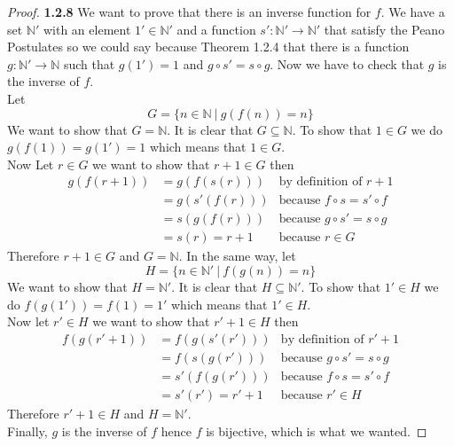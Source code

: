 \documentclass[11pt]{article}
\newcommand{\N}{\mathbb{N}}
\theoremstyle{definition}
\begin{document}
    \begin{proof}{\textbf{1.2.8}}
        We want to prove that there is an inverse function for $f$. We have a
        set $\N'$ with an element $1'\in\N'$ and a function
        $s':\N'\rightarrow \N'$ that satisfy the Peano Postulates so we could
        say because Theorem 1.2.4 that there is a function
        $g:\N' \rightarrow \N$ such that $g(1') = 1$ and $g \circ s' = s \circ g$.
        Now we have to check that $g$ is the inverse of $f$.\\
        Let
        $$G = \{n \in \N ~|~ g(f(n)) = n\}$$
        We want to show that $G = \N$. It  is clear that $G\subseteq\N$.
        To show that $1 \in G$ we do $g(f(1)) = g(1') = 1$ which means that
        $1 \in G$.\\
        Now Let $r \in G$ we want to show that $r+1 \in G$ then
        \begin{align*}
            g(f(r+1)) &= g(f(s(r))) & \text{by definition of }r+1\\
                &= g(s'(f(r))) & \text{because }f \circ s = s' \circ f\\
                &= s(g(f(r))) & \text{because }g \circ s' = s \circ g\\
                &= s(r) = r + 1 & \text{because }r \in G
        \end{align*}
        Therefore $r+1 \in G$ and $G = \N$.
        In the same way, let
        $$H = \{n \in \N' ~|~ f(g(n)) = n\}$$ 
        We want to show that $H = \N'$. It  is clear that $H\subseteq\N'$.
        To show that $1' \in H$ we do $f(g(1')) = f(1) = 1'$ which means that
        $1' \in H$.\\
        Now let $r' \in H$ we want to show that $r' +1 \in H$ then
        \begin{align*}
            f(g(r'+1)) &= f(g(s'(r'))) & \text{by definition of }r'+1\\
                &= f(s(g(r'))) & \text{because }g \circ s' = s \circ g\\
                &= s'(f(g(r'))) & \text{because }f \circ s = s' \circ f\\
                &= s'(r') = r' + 1 & \text{because }r' \in H
        \end{align*}
        Therefore $r'+1 \in H$ and $H = \N'$.\\
        Finally, $g$ is the inverse of $f$ hence $f$ is bijective, which is
        what we wanted.
    \end{proof}
\end{document}
